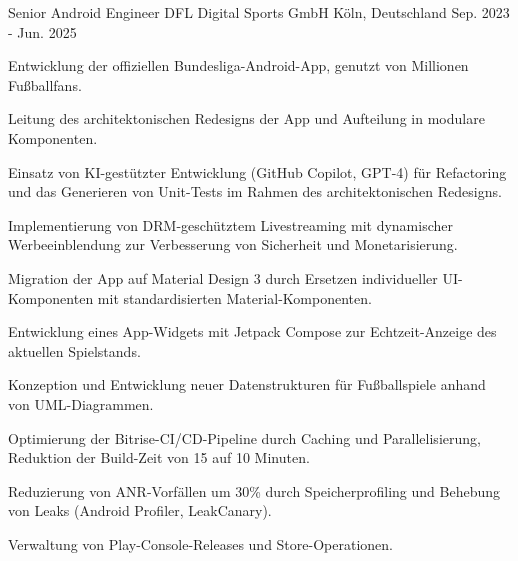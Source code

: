 \begin{cventries}
  \cventry
    {Senior Android Engineer} %
    {DFL Digital Sports GmbH} %
    {Köln, Deutschland} %
    {Sep. 2023 - Jun. 2025} %
    {
      \begin{cvitems} %
        \item {Entwicklung der offiziellen Bundesliga-Android-App, genutzt von Millionen Fußballfans.}
        \item {Leitung des architektonischen Redesigns der App und Aufteilung in modulare Komponenten.}
        \item {Einsatz von KI-gestützter Entwicklung (GitHub Copilot, GPT-4) für Refactoring und das Generieren von Unit-Tests im Rahmen des architektonischen Redesigns.}
        \item {Implementierung von DRM-geschütztem Livestreaming mit dynamischer Werbeeinblendung zur Verbesserung von Sicherheit und Monetarisierung.}
        \item {Migration der App auf Material Design 3 durch Ersetzen individueller UI-Komponenten mit standardisierten Material-Komponenten.}
        \item {Entwicklung eines App-Widgets mit Jetpack Compose zur Echtzeit-Anzeige des aktuellen Spielstands.}
        \item {Konzeption und Entwicklung neuer Datenstrukturen für Fußballspiele anhand von UML-Diagrammen.}
        \item {Optimierung der Bitrise-CI/CD-Pipeline durch Caching und Parallelisierung, Reduktion der Build-Zeit von 15 auf 10 Minuten.}
        \item {Reduzierung von ANR-Vorfällen um 30\% durch Speicherprofiling und Behebung von Leaks (Android Profiler, LeakCanary).}
        \item {Verwaltung von Play-Console-Releases und Store-Operationen.}
      \end{cvitems}
    }


\end{cventries}
